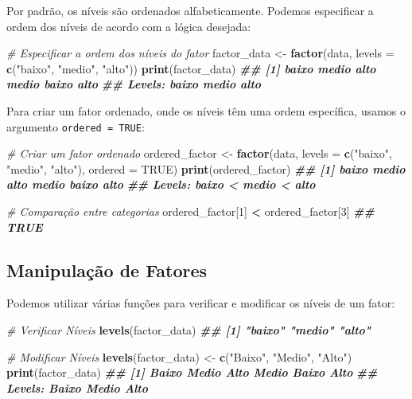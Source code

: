 \documentclass[
]{book}
\newenvironment{Shaded}{\begin{snugshade}}{\end{snugshade}}
\newcommand{\AttributeTok}[1]{\textcolor[rgb]{0.13,0.29,0.53}{#1}}
\newcommand{\CommentTok}[1]{\textcolor[rgb]{0.56,0.35,0.01}{\textit{#1}}}
\newcommand{\ConstantTok}[1]{\textcolor[rgb]{0.56,0.35,0.01}{#1}}
\newcommand{\DecValTok}[1]{\textcolor[rgb]{0.00,0.00,0.81}{#1}}
\newcommand{\DocumentationTok}[1]{\textcolor[rgb]{0.56,0.35,0.01}{\textbf{\textit{#1}}}}
\newcommand{\FunctionTok}[1]{\textcolor[rgb]{0.13,0.29,0.53}{\textbf{#1}}}
\newcommand{\NormalTok}[1]{#1}
\newcommand{\OtherTok}[1]{\textcolor[rgb]{0.56,0.35,0.01}{#1}}
\newcommand{\SpecialCharTok}[1]{\textcolor[rgb]{0.81,0.36,0.00}{\textbf{#1}}}
\newcommand{\StringTok}[1]{\textcolor[rgb]{0.31,0.60,0.02}{#1}}
\begin{document}
Por padrão, os níveis são ordenados alfabeticamente. Podemos especificar
a ordem dos níveis de acordo com a lógica desejada:

\begin{Shaded}
\begin{Highlighting}[]
\CommentTok{\# Especificar a ordem dos níveis do fator}
\NormalTok{factor\_data }\OtherTok{\textless{}{-}} \FunctionTok{factor}\NormalTok{(data, }\AttributeTok{levels =} \FunctionTok{c}\NormalTok{(}\StringTok{"baixo"}\NormalTok{, }\StringTok{"medio"}\NormalTok{, }\StringTok{"alto"}\NormalTok{))}
\FunctionTok{print}\NormalTok{(factor\_data)}
\DocumentationTok{\#\# [1] baixo    medio alto   medio baixo    alto}
\DocumentationTok{\#\# Levels: baixo medio alto}
\end{Highlighting}
\end{Shaded}

Para criar um fator ordenado, onde os níveis têm uma ordem específica,
usamos o argumento \texttt{ordered\ =\ TRUE}:

\begin{Shaded}
\begin{Highlighting}[]
\CommentTok{\# Criar um fator ordenado}
\NormalTok{ordered\_factor }\OtherTok{\textless{}{-}} \FunctionTok{factor}\NormalTok{(data, }\AttributeTok{levels =} \FunctionTok{c}\NormalTok{(}\StringTok{"baixo"}\NormalTok{, }\StringTok{"medio"}\NormalTok{, }\StringTok{"alto"}\NormalTok{), }\AttributeTok{ordered =} \ConstantTok{TRUE}\NormalTok{)}
\FunctionTok{print}\NormalTok{(ordered\_factor)}
\DocumentationTok{\#\# [1] baixo    medio alto   medio baixo    alto}
\DocumentationTok{\#\# Levels: baixo \textless{} medio \textless{} alto}

\CommentTok{\# Comparação entre categorias}
\NormalTok{ordered\_factor[}\DecValTok{1}\NormalTok{] }\SpecialCharTok{\textless{}}\NormalTok{ ordered\_factor[}\DecValTok{3}\NormalTok{]}
\DocumentationTok{\#\# TRUE}
\end{Highlighting}
\end{Shaded}

\subsection{Manipulação de Fatores}\label{manipulauxe7uxe3o-de-fatores}

Podemos utilizar várias funções para verificar e modificar os níveis de
um fator:

\begin{Shaded}
\begin{Highlighting}[]
\CommentTok{\# Verificar Níveis}
\FunctionTok{levels}\NormalTok{(factor\_data)}
\DocumentationTok{\#\# [1] "baixo"    "medio" "alto"}

\CommentTok{\# Modificar Níveis}
\FunctionTok{levels}\NormalTok{(factor\_data) }\OtherTok{\textless{}{-}} \FunctionTok{c}\NormalTok{(}\StringTok{"Baixo"}\NormalTok{, }\StringTok{"Medio"}\NormalTok{, }\StringTok{"Alto"}\NormalTok{)}
\FunctionTok{print}\NormalTok{(factor\_data)}
\DocumentationTok{\#\# [1] Baixo    Medio Alto   Medio Baixo    Alto}
\DocumentationTok{\#\# Levels: Baixo Medio Alto}
\end{Highlighting}
\end{Shaded}
\end{document}
